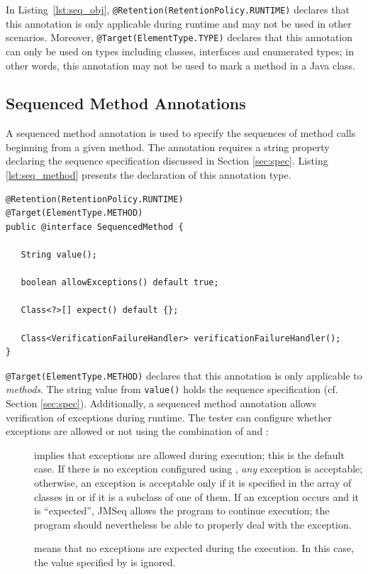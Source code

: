 In Listing~\ref{lst:seq_obj}, {\small\texttt{@Retention(RetentionPolicy.RUNTIME)}} declares that this
annotation is only applicable during runtime and may  not be used in other scenarios.
Moreover, {\small\texttt{@Target(ElementType.TYPE)}} declares that this
annotation can only be used on types including classes, interfaces and
enumerated types; in other words, this annotation may not be used to mark a method
in a Java class.

\subsection{Sequenced Method Annotations}
A sequenced method annotation is used to specify the sequences of method
calls beginning from a given method. The annotation requires a string
property declaring the sequence specification discussed in Section
\ref{sec:spec}. Listing \ref{lst:seq_method} presents the declaration of
this annotation type.

\lstset{language=Java}
\begin{lstlisting}[label=lst:seq_method, caption=SequencedMethod Annotation Declaration]
@Retention(RetentionPolicy.RUNTIME)
@Target(ElementType.METHOD)
public @interface SequencedMethod {

   String value();

   boolean allowExceptions() default true;

   Class<?>[] expect() default {};

   Class<VerificationFailureHandler> verificationFailureHandler();
}
\end{lstlisting}

{\small\texttt{@Target(ElementType.METHOD)}} declares that this annotation is
only applicable to \textit{methods}. The string value from
{\small\texttt{value()}} holds the sequence specification (cf.
Section \ref{sec:spec}). 
Additionally, a sequenced method annotation allows verification of
exceptions during runtime. The tester can configure whether exceptions
are allowed or not using the combination of 
and :
\begin{description}
  \item[] implies that exceptions are allowed during execution; 
  this is the default case.
If there is no exception configured using ,
\emph{any} exception is acceptable; otherwise,  an exception is acceptable 
only if it is specified in the array
of classes in  or if it is a subclass of one of them.
If an exception occurs and it is ``expected'', JMSeq allows the program to continue execution;
the program should nevertheless be able to properly deal with the exception.

  \item[]  means that no exceptions are
expected during the execution. In this case, the value specified by
 is ignored.
\end{description}


